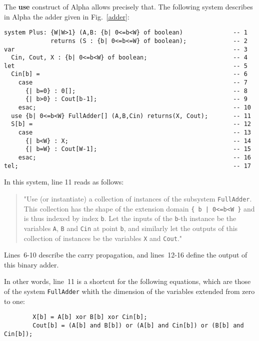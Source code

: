 \documentclass[12pt]{article}
\newcommand{\Alpha}{{\sc Alpha}}
\newcommand{\alfa}{\Alpha}
\begin{document}
The \textbf{use} construct of {\alfa} allows precisely that. The
following system describes in {\alfa} the adder given in
Fig.~\ref{adder}:
\begin{verbatim}
system Plus: {W|W>1} (A,B: {b| 0<=b<W} of boolean)              -- 1       
             returns (S : {b| 0<=b<=W} of boolean);             -- 2       
var                                                             -- 3       
  Cin, Cout, X : {b| 0<=b<W} of boolean;                        -- 4       
let                                                             -- 5       
  Cin[b] =                                                      -- 6       
    case                                                        -- 7       
      {| b=0} : 0[];                                            -- 8       
      {| b>0} : Cout[b-1];                                      -- 9       
    esac;                                                       -- 10      
  use {b| 0<=b<W} FullAdder[] (A,B,Cin) returns(X, Cout);       -- 11      
  S[b] =                                                        -- 12      
    case                                                        -- 13      
      {| b<W} : X;                                              -- 14      
      {| b=W} : Cout[W-1];                                      -- 15      
    esac;                                                       -- 16      
tel;                                                            -- 17      
\end{verbatim}
In this system, line 11 reads as follows: 
\begin{quote}
"Use (or instantiate)
a collection of
instances of the subsystem \texttt{FullAdder}. This collection has the
shape of the extension domain 
\verb!{ b | 0<=b<W }! and is thus indexed
by index \texttt{b}. Let the inputs of the \texttt{b}-th instance be
the variables \texttt{A}, \texttt{B} and \texttt{Cin} at point
\texttt{b}, and similarly let the outputs of this collection of
instances be the variables \texttt{X} and \texttt{Cout}."
\end{quote}
Lines~6-10 describe the carry propagation, and lines~12-16
define the output of this binary adder.

In other words, line~11 is a shortcut for the following equations,
which are those of the system \texttt{FullAdder} whith the dimension
of the variables extended from zero to one:
\begin{verbatim}
        X[b] = A[b] xor B[b] xor Cin[b];
        Cout[b] = (A[b] and B[b]) or (A[b] and Cin[b]) or (B[b] and Cin[b]);
\end{verbatim}
\end{document}
